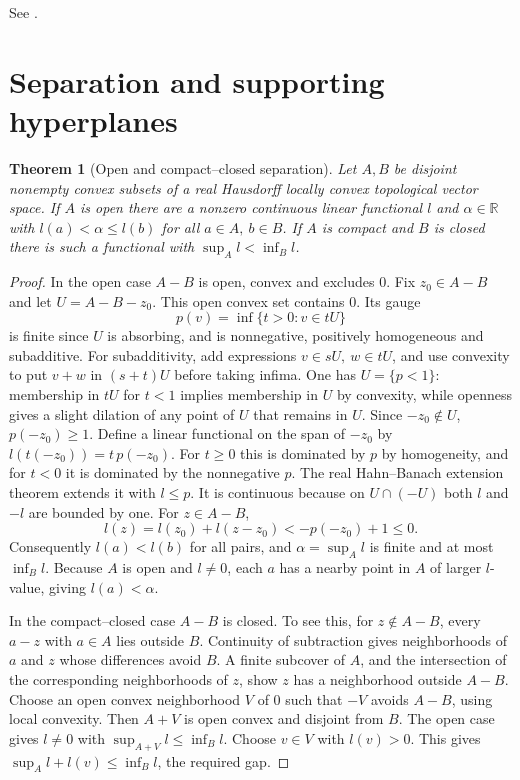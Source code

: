 \documentclass[11pt,oneside,openany]{book}
\theoremstyle{plain}
\newtheorem{theorem}{Theorem}[chapter]
\theoremstyle{definition}
\theoremstyle{remark}
\begin{document}
See \cite[\S\S17, 18, and 21]{Rockafellar}.

\section{Separation and supporting hyperplanes}\label{v01-04}

\begin{theorem}[Open and compact--closed separation]
\label{thm:geometric-separation}
Let \(A,B\) be disjoint nonempty convex subsets of a real
Hausdorff locally convex topological vector space. If \(A\)
is open there are a nonzero continuous linear functional \(l\)
and \(\alpha\in\mathbb R\) with
\(l(a)<\alpha\le l(b)\) for all \(a\in A,\ b\in B\).
If \(A\) is compact and \(B\) is closed there is such a functional
with \(\sup_A l<\inf_B l\).
\end{theorem}

\begin{proof}
In the open case \(A-B\) is open, convex and excludes \(0\).
Fix \(z_0\in A-B\) and let \(U=A-B-z_0\). This open convex set
contains \(0\). Its gauge
\[
 p(v)=\inf\{t>0:v\in tU\}
\]
is finite since \(U\) is absorbing, and is nonnegative,
positively homogeneous and subadditive. For subadditivity, add
expressions \(v\in sU,\ w\in tU\), and use convexity to put
\(v+w\) in \((s+t)U\) before taking infima. One has \(U=\{p<1\}\):
membership in \(tU\) for \(t<1\) implies membership in \(U\)
by convexity, while openness gives a slight dilation of any point
of \(U\) that remains in \(U\). Since \(-z_0\notin U\),
\(p(-z_0)\ge1\). Define a linear functional on the span of
\(-z_0\) by \(l(t(-z_0))=t\,p(-z_0)\). For \(t\ge0\) this is
dominated by \(p\) by homogeneity, and for \(t<0\) it is dominated
by the nonnegative \(p\). The real Hahn--Banach extension theorem
extends it with \(l\le p\). It is continuous because on
\(U\cap(-U)\) both \(l\) and \(-l\) are bounded by one.
For \(z\in A-B\),
\[
 l(z)=l(z_0)+l(z-z_0)<-p(-z_0)+1\le0.
\]
Consequently \(l(a)<l(b)\) for all pairs, and
\(\alpha=\sup_A l\) is finite and at most \(\inf_B l\).
Because \(A\) is open and \(l\neq0\), each \(a\) has a nearby
point in \(A\) of larger \(l\)-value, giving \(l(a)<\alpha\).

In the compact--closed case \(A-B\) is closed. To see this,
for \(z\notin A-B\), every \(a-z\) with \(a\in A\) lies outside
\(B\). Continuity of subtraction gives neighborhoods of \(a\)
and \(z\) whose differences avoid \(B\). A finite subcover
of \(A\), and the intersection of the corresponding
neighborhoods of \(z\), show \(z\) has a neighborhood outside
\(A-B\). Choose an open convex neighborhood \(V\) of \(0\)
such that \(-V\) avoids \(A-B\), using local convexity.
Then \(A+V\) is open convex and disjoint from \(B\).
The open case gives \(l\neq0\) with
\(\sup_{A+V}l\le\inf_B l\). Choose \(v\in V\) with \(l(v)>0\).
This gives \(\sup_A l+l(v)\le\inf_B l\), the required gap.
\end{proof}
\end{document}
